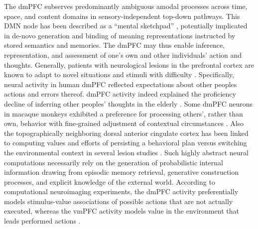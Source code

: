 \documentclass{article} %
\begin{document}
The dmPFC subserves predominantly ambiguous amodal processes
across time, space, and content domains in
sensory-independent top-down pathways.
This DMN node has been described as a “mental sketchpad”
\citep{goldman1996prefrontal},
potentially implicated in de-novo generation and binding
of meaning representations instructed by stored semantics and memories.
%
The dmPFC may thus enable inference, representation, and assessment
of one's own and other individuals' action and thoughts.
Generally,
patients with neurological lesions in the prefrontal cortex
are known to adapt to novel situations and stimuli with difficulty
\citep{stuss1986frontal}.
Specifically, neural activity in human dmPFC
reflected expectations about other peoples actions and errors thereof.
dmPFC activity indeed explained the proficiency decline
of inferring other peoples' thoughts in the elderly \citep{moran2012social}.
Some dmPFC neurons in macaque monkeys exhibited a preference
for processing others', rather than own, behavior
with fine-grained adjustment of contextual circumstances \citep{yoshida2010neural}.
Also the topographically neighboring dorsal anterior cingulate cortex
has been linked to computing values and efforts of
persisting a behavioral plan versus switching the
environmental context in several lesion studies \citep{kolling2016value}.
%
Such highly abstract neural computations necessarily rely on the
generation of probabilistic internal information drawing from
episodic memory retrieval, generative construction processes,
and explicit knowledge of the external world.
%
According to computational neuroimaging experiments,
the dmPFC activity preferentially models stimulus-value associations of
possible actions that are not actually executed,
whereas the vmPFC activity models value in the environment that leads performed actions
\citep{nicolle2012agent}.
\end{document}
